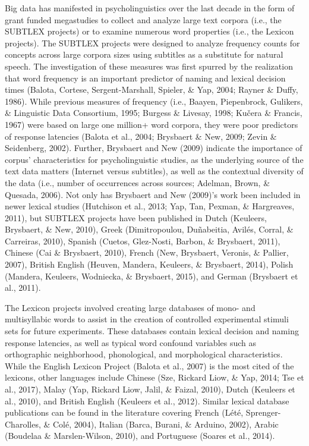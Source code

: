 \documentclass[english,,man]{apa6}
\theoremstyle{definition}
\theoremstyle{definition}
\theoremstyle{definition}
\theoremstyle{remark}
\begin{document}
Big data has manifested in psycholinguistics over the last decade in the
form of grant funded megastudies to collect and analyze large text
corpora (i.e., the SUBTLEX projects) or to examine numerous word
properties (i.e., the Lexicon projects). The SUBTLEX projects were
designed to analyze frequency counts for concepts across large corpora
sizes using subtitles as a substitute for natural speech. The
investigation of these measures was first spurred by the realization
that word frequency is an important predictor of naming and lexical
decision times (Balota, Cortese, Sergent-Marshall, Spieler, \& Yap,
2004; Rayner \& Duffy, 1986). While previous measures of frequency
(i.e., Baayen, Piepenbrock, Gulikers, \& Linguistic Data Consortium,
1995; Burgess \& Livesay, 1998; Kučera \& Francis, 1967) were based on
large one million+ word corpora, they were poor predictors of response
latencies (Balota et al., 2004; Brysbaert \& New, 2009; Zevin \&
Seidenberg, 2002). Further, Brysbaert and New (2009) indicate the
importance of corpus' characteristics for psycholinguistic studies, as
the underlying source of the text data matters (Internet versus
subtitles), as well as the contextual diversity of the data (i.e.,
number of occurrences across sources; Adelman, Brown, \& Quesada, 2006).
Not only has Brysbaert and New (2009)'s work been included in newer
lexical studies (Hutchison et al., 2013; Yap, Tan, Pexman, \&
Hargreaves, 2011), but SUBTLEX projects have been published in Dutch
(Keuleers, Brysbaert, \& New, 2010), Greek (Dimitropoulou, Duñabeitia,
Avilés, Corral, \& Carreiras, 2010), Spanish (Cuetos, Glez-Nosti,
Barbon, \& Brysbaert, 2011), Chinese (Cai \& Brysbaert, 2010), French
(New, Brysbaert, Veronis, \& Pallier, 2007), British English (Heuven,
Mandera, Keuleers, \& Brysbaert, 2014), Polish (Mandera, Keuleers,
Wodniecka, \& Brysbaert, 2015), and German (Brysbaert et al., 2011).

The Lexicon projects involved creating large databases of mono- and
multisyllabic words to assist in the creation of controlled experimental
stimuli sets for future experiments. These databases contain lexical
decision and naming response latencies, as well as typical word confound
variables such as orthographic neighborhood, phonological, and
morphological characteristics. While the English Lexicon Project (Balota
et al., 2007) is the most cited of the lexicons, other languages include
Chinese (Sze, Rickard Liow, \& Yap, 2014; Tse et al., 2017), Malay (Yap,
Rickard Liow, Jalil, \& Faizal, 2010), Dutch (Keuleers et al., 2010),
and British English (Keuleers et al., 2012). Similar lexical database
publications can be found in the literature covering French (Lété,
Sprenger-Charolles, \& Colé, 2004), Italian (Barca, Burani, \& Arduino,
2002), Arabic (Boudelaa \& Marslen-Wilson, 2010), and Portuguese (Soares
et al., 2014).
\end{document}
